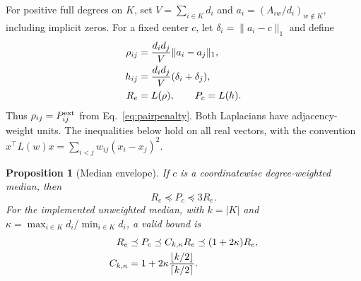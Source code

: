 \documentclass[sigconf,anonymous,review]{acmart}
\newtheorem{proposition}{Proposition}
\newcommand{\1}{\mathbf{1}}
\begin{document}
For positive full degrees on $K$, set $V=\sum_{i\in K}d_i$ and
$a_i=(A_{iw}/d_i)_{w\notin K}$, including implicit zeros. For a fixed center $c$,
let $\delta_i=\|a_i-c\|_1$ and define
\begin{align}
 \rho_{ij}&=\frac{d_id_j}{V}\|a_i-a_j\|_1,\notag\\
 h_{ij}&=\frac{d_id_j}{V}(\delta_i+\delta_j),\notag\\
 R_e&=L(\rho),\qquad P_c=L(h).\label{eq:profile-penalty-laplacians}
\end{align}
Thus $\rho_{ij}=P_{ij}^{\rm ext}$ from Eq.~\eqref{eq:pairpenalty}.
Both Laplacians have adjacency-weight units. The inequalities below hold on
all real vectors, with the convention
$x^\top L(w)x=\sum_{i<j}w_{ij}(x_i-x_j)^2$.

\begin{proposition}[Median envelope]\label{prop:profile-envelope}
If $c$ is a coordinatewise degree-weighted median, then
\[
 R_e\preceq P_c\preceq3R_e.
\]
For the implemented unweighted median, with $k=|K|$ and
$\kappa=\max_{i\in K}d_i/\min_{i\in K}d_i$, a valid bound is
\begin{align}
 R_e&\preceq P_c\preceq C_{k,\kappa}R_e
       \preceq(1+2\kappa)R_e,\notag\\
 C_{k,\kappa}&=1+2\kappa
   \frac{\lfloor k/2\rfloor}{\lceil k/2\rceil}.
 \label{eq:production-profile-envelope}
\end{align}
\end{proposition}
\end{document}
